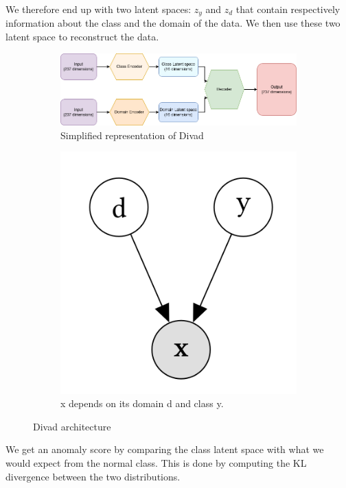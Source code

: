 \documentclass[oneside, a4paper, onecolumn, 11pt]{article}
\begin{document}
We therefore end up with two latent spaces: $z_y$ and $z_d$ that contain respectively information about the class and the domain of the data. We then use these two latent space to reconstruct the data.
\begin{figure}[H]
  \centering
  \begin{subfigure}{0.6\textwidth}
      \centering
      \includegraphics[width=\linewidth]{images/divad_simple.png}
      \caption{Simplified representation of Divad}
      \label{fig:divad_simple}
  \end{subfigure}
  \begin{subfigure}{0.2\textwidth}
      \centering
      \includegraphics[width=\linewidth]{images/divad_assum.png}
      \caption{ x depends on its domain d and class y.}
      \label{fig:divad_assum}
  \end{subfigure}
  \caption{Divad architecture}
\end{figure}
We get an anomaly score by comparing the class latent space with what we would expect from the normal class. This is done by computing the KL divergence between the two distributions.\\
\end{document}
